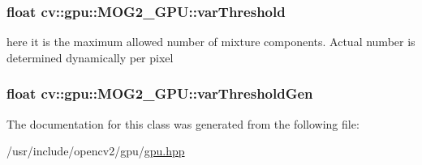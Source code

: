 \hypertarget{classcv_1_1gpu_1_1MOG2__GPU_a19f742a3fa03f0d43e73a288b8cab65c}{
\subsubsection[{var\-Threshold}]{\setlength{\rightskip}{0pt plus 5cm}float cv\-::gpu\-::\-M\-O\-G2\-\_\-\-G\-P\-U\-::var\-Threshold}}\label{classcv_1_1gpu_1_1MOG2__GPU_a19f742a3fa03f0d43e73a288b8cab65c}
here it is the maximum allowed number of mixture components. Actual number is determined dynamically per pixel \hypertarget{classcv_1_1gpu_1_1MOG2__GPU_a90ab8efe3e16585ecb93656d321fbebc}{
\subsubsection[{var\-Threshold\-Gen}]{\setlength{\rightskip}{0pt plus 5cm}float cv\-::gpu\-::\-M\-O\-G2\-\_\-\-G\-P\-U\-::var\-Threshold\-Gen}}\label{classcv_1_1gpu_1_1MOG2__GPU_a90ab8efe3e16585ecb93656d321fbebc}


The documentation for this class was generated from the following file\-:\begin{DoxyCompactItemize}
\item 
/usr/include/opencv2/gpu/\hyperlink{gpu_2gpu_8hpp}{gpu.\-hpp}\end{DoxyCompactItemize}
